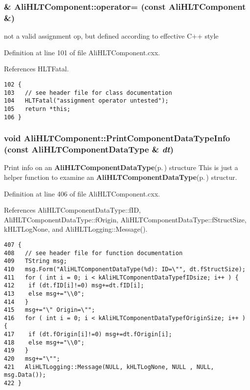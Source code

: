\subsubsection{ \& Ali\-HLTComponent::operator= (const {\bf Ali\-HLTComponent} \&)}\label{classAliHLTComponent_a2}


not a valid assignment op, but defined according to effective C++ style 

Definition at line 101 of file Ali\-HLTComponent.cxx.

References HLTFatal.

\footnotesize\begin{verbatim}102 { 
103   // see header file for class documentation
104   HLTFatal("assignment operator untested");
105   return *this;
106 }
\end{verbatim}\normalsize 


\subsubsection{\setlength{\rightskip}{0pt plus 5cm}void Ali\-HLTComponent::Print\-Component\-Data\-Type\-Info (const {\bf Ali\-HLTComponent\-Data\-Type} \& {\em dt})}\label{classAliHLTComponent_a16}


Print info on an {\bf Ali\-HLTComponent\-Data\-Type}{\rm (p.\,\pageref{structAliHLTComponentDataType})} structure This is just a helper function to examine an {\bf Ali\-HLTComponent\-Data\-Type}{\rm (p.\,\pageref{structAliHLTComponentDataType})} structur. 

Definition at line 406 of file Ali\-HLTComponent.cxx.

References Ali\-HLTComponent\-Data\-Type::f\-ID, Ali\-HLTComponent\-Data\-Type::f\-Origin, Ali\-HLTComponent\-Data\-Type::f\-Struct\-Size, k\-HLTLog\-None, and Ali\-HLTLogging::Message().

\footnotesize\begin{verbatim}407 {
408   // see header file for function documentation
409   TString msg;
410   msg.Form("AliHLTComponentDataType(%d): ID=\"", dt.fStructSize);
411   for ( int i = 0; i < kAliHLTComponentDataTypefIDsize; i++ ) {
412    if (dt.fID[i]!=0) msg+=dt.fID[i];
413    else msg+="\\0";
414   }
415   msg+="\" Origin=\"";
416   for ( int i = 0; i < kAliHLTComponentDataTypefOriginSize; i++ ) {
417    if (dt.fOrigin[i]!=0) msg+=dt.fOrigin[i];
418    else msg+="\\0";
419   }
420   msg+="\"";
421   AliHLTLogging::Message(NULL, kHLTLogNone, NULL , NULL, msg.Data());
422 }
\end{verbatim}\normalsize 


